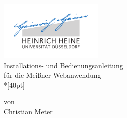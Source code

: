 
\begin{titlepage}
  \centering
  \includegraphics[width=5cm]{fig/unilogo}\\

  \vfill
  \huge
  Installations- und Bedienungsanleitung\\für die Meißner Webanwendung\\*[40pt]
  \normalsize

  \vfill
  \large
  \normalsize
  von\\
  \Large
  Christian Meter
    
\end{titlepage}


